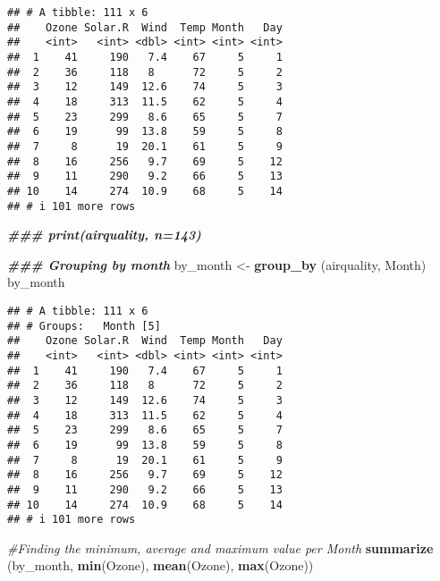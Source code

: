 \documentclass[
]{article}
\newenvironment{Shaded}{\begin{snugshade}}{\end{snugshade}}
\newcommand{\CommentTok}[1]{\textcolor[rgb]{0.56,0.35,0.01}{\textit{#1}}}
\newcommand{\DocumentationTok}[1]{\textcolor[rgb]{0.56,0.35,0.01}{\textbf{\textit{#1}}}}
\newcommand{\FunctionTok}[1]{\textcolor[rgb]{0.13,0.29,0.53}{\textbf{#1}}}
\newcommand{\NormalTok}[1]{#1}
\newcommand{\OtherTok}[1]{\textcolor[rgb]{0.56,0.35,0.01}{#1}}
\begin{document}
\begin{verbatim}
## # A tibble: 111 x 6
##    Ozone Solar.R  Wind  Temp Month   Day
##    <int>   <int> <dbl> <int> <int> <int>
##  1    41     190   7.4    67     5     1
##  2    36     118   8      72     5     2
##  3    12     149  12.6    74     5     3
##  4    18     313  11.5    62     5     4
##  5    23     299   8.6    65     5     7
##  6    19      99  13.8    59     5     8
##  7     8      19  20.1    61     5     9
##  8    16     256   9.7    69     5    12
##  9    11     290   9.2    66     5    13
## 10    14     274  10.9    68     5    14
## # i 101 more rows
\end{verbatim}

\begin{Shaded}
\begin{Highlighting}[]
\DocumentationTok{\#\#\# print(airquality, n=143)}
\end{Highlighting}
\end{Shaded}

\begin{Shaded}
\begin{Highlighting}[]
\DocumentationTok{\#\#\# Grouping by month}
\NormalTok{by\_month }\OtherTok{\textless{}{-}} \FunctionTok{group\_by}\NormalTok{ (airquality, Month)}
\NormalTok{by\_month}
\end{Highlighting}
\end{Shaded}

\begin{verbatim}
## # A tibble: 111 x 6
## # Groups:   Month [5]
##    Ozone Solar.R  Wind  Temp Month   Day
##    <int>   <int> <dbl> <int> <int> <int>
##  1    41     190   7.4    67     5     1
##  2    36     118   8      72     5     2
##  3    12     149  12.6    74     5     3
##  4    18     313  11.5    62     5     4
##  5    23     299   8.6    65     5     7
##  6    19      99  13.8    59     5     8
##  7     8      19  20.1    61     5     9
##  8    16     256   9.7    69     5    12
##  9    11     290   9.2    66     5    13
## 10    14     274  10.9    68     5    14
## # i 101 more rows
\end{verbatim}

\begin{Shaded}
\begin{Highlighting}[]
\CommentTok{\#Finding the minimum, average and maximum value per Month}
\FunctionTok{summarize}\NormalTok{ (by\_month, }\FunctionTok{min}\NormalTok{(Ozone), }\FunctionTok{mean}\NormalTok{(Ozone), }\FunctionTok{max}\NormalTok{(Ozone))}
\end{Highlighting}
\end{Shaded}
\end{document}
